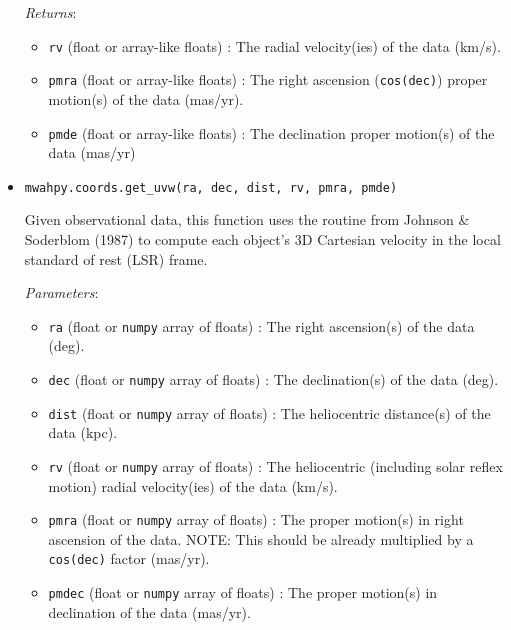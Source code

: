 \documentclass{article}
\begin{document}
\begin{itemize}
\begin{itemize}
\end{itemize}

\textit{Returns}: \begin{itemize}

\item \verb!rv! (float or array-like floats) : The radial velocity(ies) of the data (km/s).

\item \verb!pmra! (float or array-like floats) : The right ascension (\verb!cos(dec)!) proper motion(s) of the data (mas/yr).

\item \verb!pmde! (float or array-like floats) : The declination proper motion(s) of the data (mas/yr)

\end{itemize}



\item \verb!mwahpy.coords.get_uvw(ra, dec, dist, rv, pmra, pmde)!

Given observational data, this function uses the routine from Johnson \& Soderblom (1987) to compute each object's 3D Cartesian velocity in the local standard of rest (LSR) frame.

\textit{Parameters}: \begin{itemize}

\item \verb!ra! (float or \verb!numpy! array of floats) : The right ascension(s) of the data (deg).

\item \verb!dec! (float or \verb!numpy! array of floats) : The declination(s) of the data (deg).

\item \verb!dist! (float or \verb!numpy! array of floats) : The heliocentric distance(s) of the data (kpc).

\item \verb!rv! (float or \verb!numpy! array of floats) : The heliocentric (including solar reflex motion) radial velocity(ies) of the data (km/s).

\item \verb!pmra! (float or \verb!numpy! array of floats) : The proper motion(s) in right ascension of the data. NOTE: This should be already multiplied by a \verb!cos(dec)! factor (mas/yr). 

\item \verb!pmdec! (float or \verb!numpy! array of floats) : The proper motion(s) in declination of the data (mas/yr).


\end{itemize}
\end{itemize}
\end{document}
